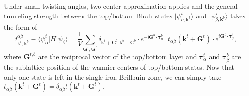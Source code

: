 \begin{subappendices}
Under small twisting angles, two-center approximation applies \cite{bistritzer2011moire} and the general tunneling strength between the top/bottom Bloch states $|\psi^t_{\alpha,\bm{k}^t}\rangle$ and $|\psi^b_{\beta,\bm{k}^b}\rangle$ takes the form of
\begin{equation}\label{two-center approximation}
	t_{\bm{k}^t,\bm{k}^b}^{\alpha\beta}\equiv\langle\psi_\alpha^t|H|\psi_\beta\rangle=\dfrac{1}{V}\sum_{\bm{G}^t,\bm{G}^b}\delta_{\bm{k}^t+\bm{G}^t,\bm{k}^b+\bm{G}^b}\cdot e^{-i\bm{G}^b\cdot\bm{\tau}^b_\alpha}\cdot t_{\alpha\beta}(\bm{k}^t+\bm{G}^t)\cdot e^{i\bm{G}^t\cdot\bm{\tau}^t_\beta},
\end{equation}
where $\bm{G}^{t,b}$ are the reciprocal vector of the top/bottom layer and $\bm{\tau}_\alpha^t$ and $\bm{\tau}_\beta^b$ are the sublattice position of the wannier centers of top/bottom states. Now that only one state is left in the single-iron Brillouin zone, we can simply take $t_{\alpha\beta}(\bm{k}^t+\bm{G}^t)=\delta_{\alpha\beta}t(\bm{k}^t+\bm{G}^t)$.


\end{subappendices}
